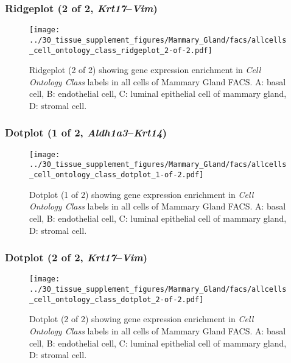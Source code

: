 \clearpage

\subsubsection{Ridgeplot (2 of 2, \emph{Krt17}--\emph{Vim})}
\begin{figure}[h]
\centering
\texttt{[image: ../30\_tissue\_supplement\_figures/Mammary\_Gland/facs/allcells\_cell\_ontology\_class\_ridgeplot\_2-of-2.pdf]}

\caption{ Ridgeplot (2 of 2)  showing gene expression enrichment in \emph{Cell Ontology Class} labels in all cells of Mammary Gland FACS. A: basal cell, B: endothelial cell, C: luminal epithelial cell of mammary gland, D: stromal cell.}
\end{figure}


\clearpage

\subsubsection{Dotplot (1 of 2, \emph{Aldh1a3}--\emph{Krt14})}
\begin{figure}[h]
\centering
\texttt{[image: ../30\_tissue\_supplement\_figures/Mammary\_Gland/facs/allcells\_cell\_ontology\_class\_dotplot\_1-of-2.pdf]}

\caption{ Dotplot (1 of 2)  showing gene expression enrichment in \emph{Cell Ontology Class} labels in all cells of Mammary Gland FACS. A: basal cell, B: endothelial cell, C: luminal epithelial cell of mammary gland, D: stromal cell.}
\end{figure}


\clearpage

\subsubsection{Dotplot (2 of 2, \emph{Krt17}--\emph{Vim})}
\begin{figure}[h]
\centering
\texttt{[image: ../30\_tissue\_supplement\_figures/Mammary\_Gland/facs/allcells\_cell\_ontology\_class\_dotplot\_2-of-2.pdf]}

\caption{ Dotplot (2 of 2)  showing gene expression enrichment in \emph{Cell Ontology Class} labels in all cells of Mammary Gland FACS. A: basal cell, B: endothelial cell, C: luminal epithelial cell of mammary gland, D: stromal cell.}
\end{figure}


\clearpage

